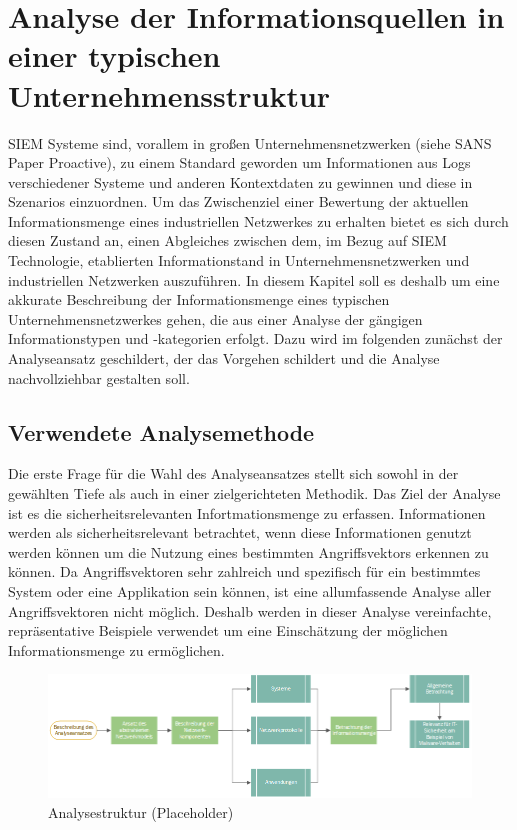 \chapter{Analyse der Informationsquellen in einer typischen Unternehmensstruktur}
\label{cha:Analyse der Informationsquellen in einer typischen Unternehmensstruktur}

SIEM Systeme sind, vorallem in großen Unternehmensnetzwerken (siehe SANS Paper Proactive), zu einem Standard geworden um Informationen aus Logs verschiedener Systeme und anderen Kontextdaten zu gewinnen und diese in Szenarios einzuordnen. Um das Zwischenziel einer Bewertung der aktuellen Informationsmenge eines industriellen Netzwerkes zu erhalten bietet es sich durch diesen Zustand an, einen Abgleiches zwischen dem, im Bezug auf SIEM Technologie, etablierten Informationstand in Unternehmensnetzwerken und industriellen Netzwerken auszuführen. In diesem Kapitel soll es deshalb um eine akkurate Beschreibung der Informationsmenge eines typischen Unternehmensnetzwerkes gehen, die aus einer Analyse der gängigen Informationstypen und -kategorien erfolgt. Dazu wird im folgenden zunächst der Analyseansatz geschildert, der das Vorgehen schildert und die Analyse nachvollziehbar gestalten soll.

\section{Verwendete Analysemethode}


Die erste Frage für die Wahl des Analyseansatzes stellt sich sowohl in der gewählten Tiefe als auch in einer zielgerichteten Methodik. Das Ziel der Analyse ist es die sicherheitsrelevanten Infortmationsmenge zu erfassen. Informationen werden als sicherheitsrelevant betrachtet, wenn diese Informationen genutzt werden können um die Nutzung eines bestimmten Angriffsvektors erkennen zu können. Da Angriffsvektoren sehr zahlreich und spezifisch für ein bestimmtes System oder eine Applikation sein können, ist eine allumfassende Analyse aller Angriffsvektoren nicht möglich. Deshalb werden in dieser Analyse vereinfachte, repräsentative Beispiele verwendet um eine Einschätzung der möglichen Informationsmenge zu ermöglichen. 

\begin{figure}[h]
\centering
\includegraphics[width=175mm]{Zeichnungen/Analyseansatz.png}
\caption{Analysestruktur (Placeholder)}
\label{fig:Analysestruktur (Placeholder)}
\end{figure}

